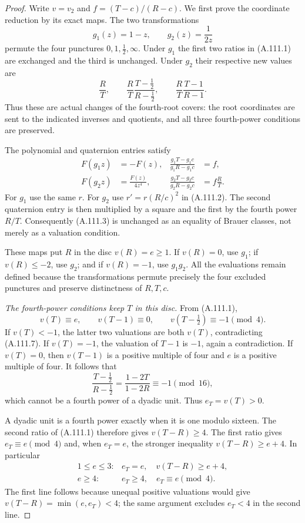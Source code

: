 \begin{proof}
Write $v=v_2$ and $f=(T-c)/(R-c)$.
We first prove the coordinate reduction by its exact maps.
The two transformations
\[
             g_1(z)=1-z,\qquad g_2(z)=\frac1{2z}
\tag{A.111.4}
\]
permute the four punctures $0,1,\tfrac12,\infty$.
Under $g_1$ the first two ratios in (A.111.1) are
exchanged and the third is unchanged.
Under $g_2$ their respective new values are
\[
 \frac RT,\qquad
 \frac RT\frac{T-\tfrac12}{R-\tfrac12},\qquad
                         \frac RT\frac{T-1}{R-1}.
\tag{A.111.5}
\]
Thus these are actual changes of the fourth-root covers:
the root coordinates are sent to the indicated inverses
and quotients, and all three fourth-power conditions
are preserved.

The polynomial and quaternion entries satisfy
\[
 \begin{aligned}
  F(g_1z)&=-F(z),&
  \frac{g_1T-g_1c}{g_1R-g_1c}&=f,\\
  F(g_2z)&=\frac{F(z)}{4z^4},&
  \frac{g_2T-g_2c}{g_2R-g_2c}&=f\frac RT.
 \end{aligned}
\tag{A.111.6}
\]
For $g_1$ use the same $r$.
For $g_2$ use $r'=r(R/c)^2$ in (A.111.2).
The second quaternion entry is then multiplied by a
square and the first by the fourth power $R/T$.
Consequently (A.111.3) is unchanged as an equality
of Brauer classes, not merely as a valuation condition.

These maps put $R$ in the disc $v(R)=e\ge1$.
If $v(R)=0$, use $g_1$; if $v(R)\le-2$, use $g_2$;
and if $v(R)=-1$, use $g_1g_2$.
All the evaluations remain defined because the
transformations permute precisely the four excluded
punctures and preserve distinctness of $R,T,c$.

\emph{The fourth-power conditions keep $T$ in this disc.}
From (A.111.1),
\[
 v(T)\equiv e,\qquad
 v(T-1)\equiv0,\qquad
 v(T-\tfrac12)\equiv-1\pmod4.
\tag{A.111.7}
\]
If $v(T)<-1$, the latter two valuations are both
$v(T)$, contradicting (A.111.7).
If $v(T)=-1$, the valuation of $T-1$ is $-1$,
again a contradiction.
If $v(T)=0$, then $v(T-1)$ is a positive multiple
of four and $e$ is a positive multiple of four.
It follows that
\[
       \frac{T-\tfrac12}{R-\tfrac12}
               =\frac{1-2T}{1-2R}\equiv-1\pmod{16},
\]
which cannot be a fourth power of a dyadic unit.
Thus $e_T=v(T)>0$.

A dyadic unit is a fourth power exactly when it
is one modulo sixteen.
The second ratio of (A.111.1) therefore gives
$v(T-R)\ge4$.
The first ratio gives $e_T\equiv e\pmod4$ and,
when $e_T=e$, the stronger inequality
$v(T-R)\ge e+4$.
In particular
\[
 \begin{array}{ll}
 1\le e\le3:& e_T=e,\quad v(T-R)\ge e+4,\\
 e\ge4:&e_T\ge4,\quad e_T\equiv e\pmod4.
 \end{array}
\tag{A.111.8}
\]
The first line follows because unequal positive
valuations would give $v(T-R)=\min(e,e_T)<4$;
the same argument excludes $e_T<4$ in the second line.


\end{proof}
